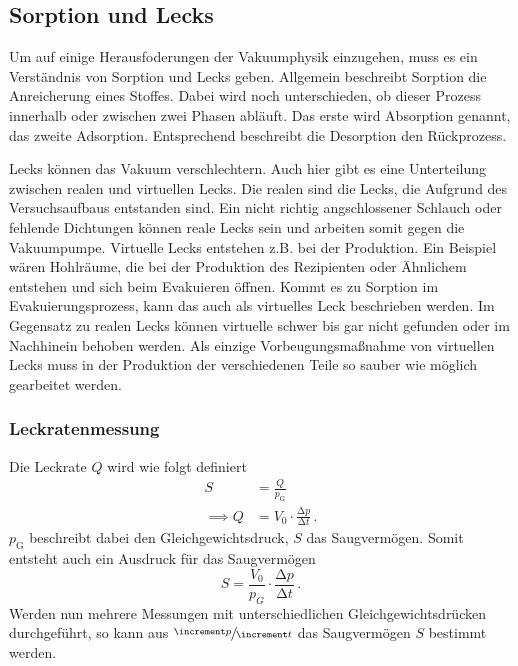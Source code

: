     \subsection{Sorption und Lecks}
        Um auf einige Herausfoderungen der Vakuumphysik einzugehen, muss es ein Verständnis von Sorption und Lecks geben.
        Allgemein beschreibt Sorption die Anreicherung eines Stoffes.
        Dabei wird noch unterschieden, ob dieser Prozess innerhalb oder zwischen zwei Phasen abläuft.
        Das erste wird Absorption genannt, das zweite Adsorption.
        Entsprechend beschreibt die Desorption den Rückprozess.

        \noindent
        Lecks können das Vakuum verschlechtern.
        Auch hier gibt es eine Unterteilung zwischen realen und virtuellen Lecks.
        Die realen sind die Lecks, die Aufgrund des Versuchsaufbaus entstanden sind.
        Ein nicht richtig angschlossener Schlauch oder fehlende Dichtungen können reale Lecks sein und arbeiten somit gegen die Vakuumpumpe.
        Virtuelle Lecks entstehen z.B. bei der Produktion.
        Ein Beispiel wären Hohlräume, die bei der Produktion des Rezipienten oder Ähnlichem entstehen und sich beim Evakuieren öffnen.
        Kommt es zu Sorption im Evakuierungsprozess, kann das auch als virtuelles Leck beschrieben werden.
        Im Gegensatz zu realen Lecks können virtuelle schwer bis gar nicht gefunden oder im Nachhinein behoben werden.
        Als einzige Vorbeugungsmaßnahme von virtuellen Lecks muss in der Produktion der verschiedenen Teile so sauber wie möglich gearbeitet werden.
        
        \subsubsection{Leckratenmessung}
            Die Leckrate $Q$ wird wie folgt definiert
            \begin{align*}
                S &= \frac{Q}{p_\text{G}} \\
                \implies Q &= V_0 \cdot \frac{\increment p}{\increment t} \, .
            \end{align*}
            $p_\text{G}$ beschreibt dabei den Gleichgewichtsdruck, $S$ das Saugvermögen.
            Somit entsteht auch ein Ausdruck für das Saugvermögen
            \begin{equation}
                S = \frac{V_0}{p_G} \cdot \frac{\increment p}{\increment t} \, .
                \label{eq:saug_leck_theorie}
            \end{equation}
            Werden nun mehrere Messungen mit unterschiedlichen Gleichgewichtsdrücken durchgeführt, so kann aus $\sfrac{\increment p}{\increment t}$ das Saugvermögen $S$ bestimmt werden.

